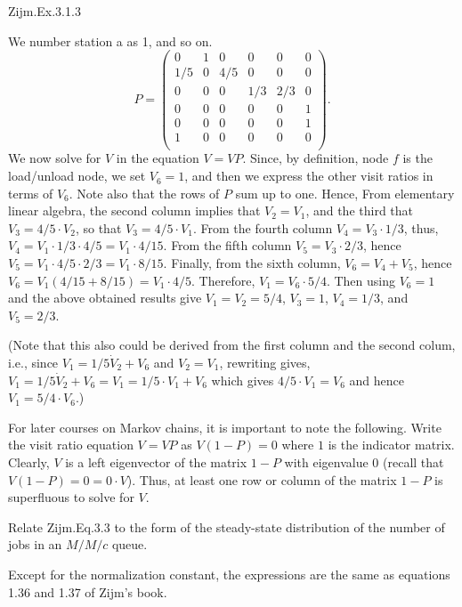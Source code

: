 \begin{exercise}
Zijm.Ex.3.1.3
\begin{solution}
We number  station a as 1, and so on.
\begin{equation*}
  P = 
  \begin{pmatrix}
     0 & 1 & 0 & 0 & 0 &0 \\
     1/5 & 0 & 4/5 & 0 & 0 & 0\\
     0& 0 & 0 & 1/3 & 2/3 & 0 \\
     0 & 0 & 0 & 0 & 0 & 1\\
     0 & 0 & 0 & 0 & 0 & 1\\
     1 & 0 & 0 & 0 & 0 & 0\\
  \end{pmatrix}.
\end{equation*}
We now solve for $V$ in the equation $V = VP$.
Since, by definition, node $f$ is the load/unload node, we set $V_6=1$, and then we express the other visit ratios in terms of $V_6$.
Note also that the rows of $P$ sum up to one.
Hence, From elementary linear algebra, the second column implies that $V_2 = V_1$, and the third that $V_3 = 4/5 \cdot V_2$, so that $V_3 = 4/5 \cdot V_1$.
From the fourth column $V_4 = V_3 \cdot 1/3 $, thus, $V_4 = V_1 \cdot 1/3 \cdot 4/5 = V_1 \cdot 4/15$.
From the fifth column $V_5 = V_3 \cdot 2/3$, hence $V_5 = V_1 \cdot 4/5 \cdot 2/3 = V_1 \cdot 8/15$.
Finally, from the sixth column, $V_6 = V_4+V_5$, hence $V_6 = V_1 (4/15 + 8/15)=V_1 \cdot 4/5$.
Therefore, $V_1 = V_6 \cdot 5/4$.
Then using $V_6 = 1$ and the above obtained results give $V_1 = V_2 = 5/4$, $V_3 = 1$, $V_4 = 1/3$, and $V_5 = 2/3$.

(Note that this also could be derived from the first column and the second colum, i.e., since $V_1 = 1/5 \dot V_2 + V_6$ and $V_2 = V_1$, rewriting gives, $V_1 = 1/5 \dot V_2 + V_6 = V_1 = 1/5 \cdot V_1 + V_6$ which gives $4/5 \cdot V_1 = V_6$ and hence $V_1 = 5/4 \cdot V_6$.)

For later courses on Markov chains, it is important to note the following.
Write the visit ratio equation $V = VP$ as $V(1-P)=0$ where $1$ is the indicator matrix.
Clearly, $V$ is a left eigenvector of the matrix $1-P$ with eigenvalue 0 (recall that $V(1-P) = 0 = 0\cdot V$).
Thus, at least one row or column of the matrix $1-P$ is superfluous to solve for $V$.
\end{solution}
\end{exercise}

\begin{exercise}
  Relate Zijm.Eq.3.3 to the form of the steady-state distribution of
  the number of jobs in an $M/M/c$ queue.
  \begin{solution}
    Except for the normalization constant, the expressions are the
    same as equations 1.36 and 1.37 of Zijm's book.
  \end{solution}
\end{exercise}

